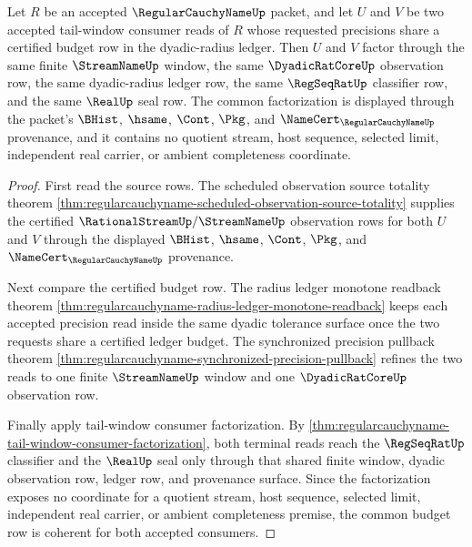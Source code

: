 \begin{theorem}
\label{thm:regularcauchyname-tail-window-budget-coherence}
Let $R$ be an accepted $\RegularCauchyNameUp$ packet, and let $U$ and $V$ be two accepted tail-window consumer reads of $R$ whose requested precisions share a certified budget row in the dyadic-radius ledger. Then $U$ and $V$ factor through the same finite $\StreamNameUp$ window, the same $\DyadicRatCoreUp$ observation row, the same dyadic-radius ledger row, the same $\RegSeqRatUp$ classifier row, and the same $\RealUp$ seal row. The common factorization is displayed through the packet's $\BHist$, $\hsame$, $\Cont$, $\Pkg$, and $\NameCert_{\RegularCauchyNameUp}$ provenance, and it contains no quotient stream, host sequence, selected limit, independent real carrier, or ambient completeness coordinate.
\end{theorem}
\begin{proof}
First read the source rows. The scheduled observation source totality theorem \autoref{thm:regularcauchyname-scheduled-observation-source-totality} supplies the certified $\RationalStreamUp/\StreamNameUp$ observation rows for both $U$ and $V$ through the displayed $\BHist$, $\hsame$, $\Cont$, $\Pkg$, and $\NameCert_{\RegularCauchyNameUp}$ provenance.

Next compare the certified budget row. The radius ledger monotone readback theorem \autoref{thm:regularcauchyname-radius-ledger-monotone-readback} keeps each accepted precision read inside the same dyadic tolerance surface once the two requests share a certified ledger budget. The synchronized precision pullback theorem \autoref{thm:regularcauchyname-synchronized-precision-pullback} refines the two reads to one finite $\StreamNameUp$ window and one $\DyadicRatCoreUp$ observation row.

Finally apply tail-window consumer factorization. By \autoref{thm:regularcauchyname-tail-window-consumer-factorization}, both terminal reads reach the $\RegSeqRatUp$ classifier and the $\RealUp$ seal only through that shared finite window, dyadic observation row, ledger row, and provenance surface. Since the factorization exposes no coordinate for a quotient stream, host sequence, selected limit, independent real carrier, or ambient completeness premise, the common budget row is coherent for both accepted consumers.
\end{proof}

